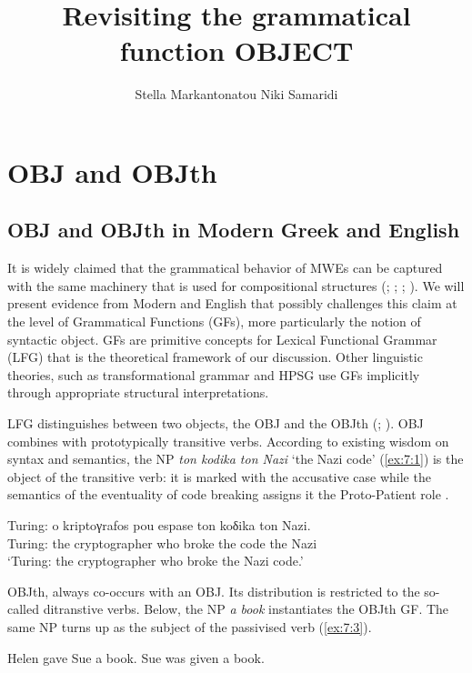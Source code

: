 \documentclass[output=paper]{langsci/langscibook}
\title{Revisiting the grammatical function OBJECT}
\author{Stella Markantonatou\affiliation{Institute for Language and Speech Processing, Athena RIC, Greece}%
\lastand Niki Samaridi\affiliation{Faculty of Philology, National and Kapodistrian University of Athens}}
\begin{document}
\section{OBJ and OBJth}\label{sec:1}

\subsection{OBJ and OBJth in Modern Greek and English}

It is widely claimed that the grammatical behavior of MWEs can be captured with
the same machinery that is used for compositional structures (\citealt{Gross1988a}; \citealt{Gross1988b}; \citealt{bargmann2016}; \citealt{kaysagidioms}). We will present evidence from Modern  and English that possibly challenges this claim at the level of Grammatical Functions (GFs), more particularly the notion of syntactic object.  GFs are primitive concepts for Lexical Functional Grammar (LFG) that is the theoretical framework of our discussion. Other linguistic theories, such as transformational grammar \citep{baker2001} and HPSG \citep{Pollard:Sag:94} use GFs implicitly through appropriate structural interpretations.

LFG distinguishes between two objects, the OBJ and the OBJth (\citealt{bresnanmoshi1990}; \citealt{dalrymple2001}). OBJ combines with prototypically transitive verbs. According to existing wisdom on syntax and semantics, the NP \textit{ton kodika ton Nazi} `the Nazi code' (\ref{ex:7:1}) is the object of the transitive verb: it is marked with the accusative case while the semantics of the eventuality of code breaking assigns it the Proto-Patient role \citep{dowty90}.

\begin{exe}
\ex \label{ex:7:1}
\gll Turing: o kriptoγrafos pou espase ton koδika ton Nazi.\\
     Turing: the cryptographer who broke the code the Nazi\\
\glt `Turing: the cryptographer who broke the Nazi code.'
\end{exe}

OBJth, \citep{bresnanmoshi1990} always co-occurs with an OBJ. Its distribution is restricted to the so-called  ditranstive verbs. Below, the NP \textit{a book} instantiates the OBJth GF. The same NP turns up as the subject of the passivised verb (\ref{ex:7:3}).

\begin{exe}
\ex \label{ex:7:2}
Helen gave Sue a book.
\ex \label{ex:7:3}
Sue was given a book.
\end{exe}
\end{document}
